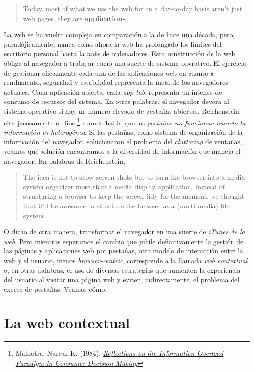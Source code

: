 \documentclass[12pt, a4paper,twoside]{book}
\begin{document}
\begin{quote}
Today, most of what we use the web for on a day-to-day basis aren't
just web pages, they are \textbf{applications}

\end{quote}
La web se ha vuelto compleja en comparación a la de hace una
década, pero, paradójicamente, nunca como ahora la web ha
prolongado los límites del escritorio personal hasta la \emph{nube}
de ordenadores. Esta construcción de la web obliga al navegador a
trabajar como una suerte de sistema operativo. El ejercicio de
gestionar eficazmente cada una de las aplicaciones web en cuanto a
rendimiento, seguridad y estabilidad representa la meta de los
navegadores actuales. Cada aplicación abierta, cada \emph{app-tab},
representa un intenso de consumo de recursos del sistema. En otras
palabras, el navegador devora al sistema operativo si hay un número
elevado de pestañas abiertas. Reichenstein cita jocosamente a Dios%
\footnote{Malhotra, Naresh K. (1984).
\emph{\href{http://www.jstor.org/pss/2488913}{Reflections on the Information Overload Paradigm in Consumer Decision Making}}}
cuando habla que las
\emph{pestañas no funcionan cuando la información es heterogénea}.
Si las pestañas, como sistema de organización de la información del
navegador, solucionaron el problema del \emph{cluttering} de
ventanas, veamos qué solución encontramos a la diversidad de
información que maneja el navegador. En palabras de Reichenstein,

\begin{quote}
The idea is not to show screen shots but to turn the browser into a
media system organizer more than a media display application.
Instead of structuring a browser to keep the screen tidy for the
moment, we thought that it'd be awesome to structure the browser as
a (multi media) file system.

\end{quote}
O dicho de otra manera, transformar el navegador en una suerte de
\emph{iTunes de la web}. Pero mientras esperamos el cambio que
jubile definitivamente la gestión de las páginas y aplicaciones web
por pestañas, otro modelo de interacción entre la web y el usuario,
menos \emph{browser-centric}, corresponde a la llamada
\emph{web contextual} o, en otras palabras, el uso de diversas
estrategias que aumenten la experiencia del usuario al visitar una
página web y eviten, indirectamente, el problema del exceso de
pestañas. Veamos cómo.

\section{La web contextual}
\end{document}

